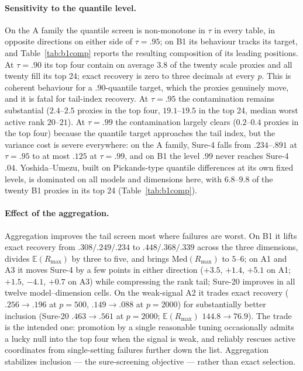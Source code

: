 \documentclass[bj,authoryear]{imsart}
\theoremstyle{plain}
\newcommand{\E}{\mathbb E}\newcommand{\R}{\mathbb R}
\begin{document}
\paragraph{Sensitivity to the quantile level.}
On the A family the quantile screen is non-monotone in $\tau$ in every
table, in opposite directions on either side of $\tau=.95$; on B1 its
behaviour tracks its target, and Table~\ref{tab:b1comp} reports the
resulting composition of its leading positions. At $\tau=.90$ its top
four contain on average $3.8$ of the twenty scale proxies and all
twenty fill its top 24; exact recovery is zero to three decimals at
every $p$. This is coherent behaviour for a $.90$-quantile target,
which the proxies genuinely move, and it is fatal for tail-index
recovery. At $\tau=.95$ the contamination remains substantial
($2.4$--$2.5$ proxies in the top four, $19.1$--$19.5$ in the top 24,
median worst active rank $20$--$21$). At $\tau=.99$ the contamination
largely clears ($0.2$--$0.4$ proxies in the top four) because the
quantile target approaches the tail index, but the variance cost is
severe everywhere: on the A family, Sure-4 falls from $.234$--$.891$
at $\tau=.95$ to at most $.125$ at $\tau=.99$, and on B1 the level
$.99$ never reaches Sure-4 $.04$. Yoshida--Umezu, built on
Pickands-type quantile differences at its own fixed levels, is
dominated on all models and dimensions here, with $6.8$--$9.8$ of the
twenty B1 proxies in its top 24 (Table~\ref{tab:b1comp}).

\paragraph{Effect of the aggregation.}
Aggregation improves the tail screen most where failures are worst. On
B1 it lifts exact recovery from $.308/.249/.234$ to $.448/.368/.339$
across the three dimensions, divides $\E(R_{\max})$ by three to five,
and brings $\mathrm{Med}(R_{\max})$ to $5$--$6$; on A1 and A3 it moves
Sure-4 by a few points in either direction ($+3.5$, $+1.4$, $+5.1$ on
A1; $+1.5$, $-4.1$, $+0.7$ on A3) while compressing the
rank tail; Sure-20 improves in all twelve model--dimension cells. On the weak-signal A2 it
trades exact recovery ($.256\to.196$ at $p=500$,
$.149\to.088$ at $p=2000$) for substantially better inclusion
(Sure-20 $.463\to.561$ at $p=2000$; $\E(R_{\max})$ $144.8\to76.9$).
The trade is the intended one: promotion by a single reasonable tuning
occasionally admits a lucky null into the top four when the signal is
weak, and reliably rescues active coordinates from single-setting
failures further down the list. Aggregation stabilizes inclusion ---
the sure-screening objective --- rather than exact selection.
\end{document}
